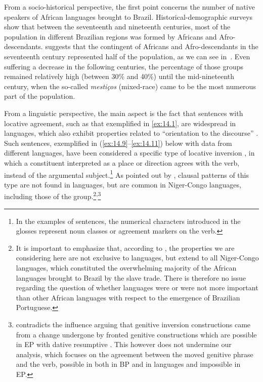 \documentclass[output=paper]{langsci/langscibook}
\begin{document}
From a socio-historical perspective, the first point concerns the number of
native speakers of African languages brought to Brazil. Historical-demographic
surveys show that between the seventeenth and nineteenth centuries, most of the
population in different Brazilian regions was formed by Africans and
Afro-descendants. \citet[163]{Mussa1991} suggests that the contingent of
Africans and Afro-descendants in the seventeenth century represented half of
the population, as we can see in~. Even suffering a decrease
in the following centuries, the percentage of those groups remained relatively
high (between 30\% and 40\%) until the mid-nineteenth century, when the
so-called \emph{mestiços} (mixed-race) came to be the most numerous part of the
population.

From a linguistic perspective, the main aspect is the fact that sentences with
locative agreement, such as that exemplified in \eqref{ex:14.1}, are widespread
in  languages, which also exhibit properties related to “orientation to
the discourse” \citep{Morimoto2006}. Such sentences, exemplified in
(\ref{ex:14.9}--\ref{ex:14.11}) below with data from different  languages, have been
considered a specific type of locative inversion \citep{Salzmann2004}, in which
a constituent interpreted as a place or direction agrees with the verb, instead
of the argumental subject.\footnote{In the examples of  sentences, the
numerical characters introduced in the glosses represent noun classes or
agreement markers on the verb.} As pointed out by \citet{Baker2008}, clausal
patterns of this type are not found in  languages, but are common
in Niger-Congo languages, including those of the  group.\footnote{It is
    important to emphasize that, according to \citet{Baker2008}, the properties
    we are considering here are not exclusive to  languages, but extend to
    all Niger-Congo languages, which constituted the overwhelming majority of
    the African languages brought to Brazil by the slave trade. There is
    therefore no issue regarding the question of whether  languages were
    or were not more important than other African languages with respect to the
    emergence of Brazilian
    Portuguese.}\textsuperscript{,}\footnote{\textcite{Melo2014} contradicts
    the  influence arguing that genitive inversion constructions came from
    a change undergone by fronted genitive constructions which are possible in
    \gls{EP} with dative resumptive . This however does not undermine
    our analysis, which focuses on the agreement between the moved genitive
    phrase and the verb, possible in both in \gls{BP} and in  languages
and impossible in \gls{EP}.}
\end{document}
